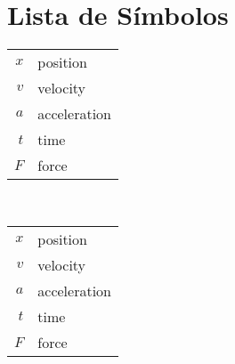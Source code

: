 \chapter*{Lista de Símbolos}


\begin{multicols}{2}
\begin{table}[H]
    \centering
    \begin{tabular}{rl}
    $x$ & position \\
    $v$ & velocity \\
    $a$ & acceleration \\
    $t$ & time \\
    $F$ & force
\end{tabular}\\
\end{table}

\begin{table}[H]
    \centering
    \begin{tabular}{rl}
    $x$ & position \\
    $v$ & velocity \\
    $a$ & acceleration \\
    $t$ & time \\
    $F$ & force
\end{tabular}\\
\end{table}

\end{multicols} 
